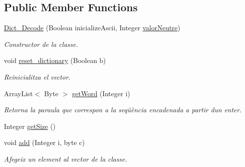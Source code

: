 \subsection*{Public Member Functions}
\begin{DoxyCompactItemize}
\item 
\hyperlink{classdomini_1_1utils_1_1Dict__Decode_a8a0f9e67c530bafc031e72c218ce74f8}{Dict\+\_\+\+Decode} (Boolean inicialize\+Ascii, Integer \hyperlink{classdomini_1_1utils_1_1Dict__Decode_a6ef2d17f449cf7a658a4bf983e2fb474}{valor\+Neutre})
\begin{DoxyCompactList}\small\item\em Constructor de la classe. \end{DoxyCompactList}\item 
void \hyperlink{classdomini_1_1utils_1_1Dict__Decode_a635432505df1ceaa58a987bb80c6b0a3}{reset\+\_\+dictionary} (Boolean b)
\begin{DoxyCompactList}\small\item\em Reinicialitza el vector. \end{DoxyCompactList}\item 
Array\+List$<$ Byte $>$ \hyperlink{classdomini_1_1utils_1_1Dict__Decode_a0f6457460aefe9df50f0cad48f58feee}{get\+Word} (Integer i)
\begin{DoxyCompactList}\small\item\em Retorna la paraula que correspon a la seqüència encadenada a partir d\textquotesingle{}un enter. \end{DoxyCompactList}\item 
Integer \hyperlink{classdomini_1_1utils_1_1Dict__Decode_aac69020c3515649e8c2d70e2908e3f3e}{get\+Size} ()
\item 
void \hyperlink{classdomini_1_1utils_1_1Dict__Decode_a077011e4507db308d143ea9b7146abb9}{add} (Integer i, byte c)
\begin{DoxyCompactList}\small\item\em Afegeix un element al vector de la classe. \end{DoxyCompactList}\end{DoxyCompactItemize}

